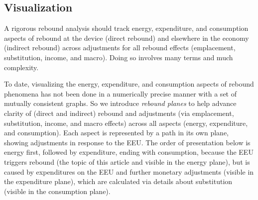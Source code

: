 \documentclass[12pt]{article}\usepackage[]{graphicx}\usepackage[]{xcolor}
\begin{document}
\subsection{Visualization}
\label{sec:path_graphs}

A rigorous rebound analysis should track
energy, expenditure, and consumption
aspects of rebound
at the device (direct rebound) and elsewhere in the economy (indirect rebound)
across adjustments for all rebound effects
(emplacement, substitution, income, and macro).
Doing so involves many terms and much complexity.

To date, visualizing the energy, expenditure, and consumption
aspects of rebound phenomena has not been
done in a numerically precise manner
with a set of mutually consistent graphs.
So we introduce \emph{rebound planes}
to help advance clarity of
(direct and indirect) rebound and
adjustments (via emplacement, substitution, income, and macro effects)
across all aspects (energy, expenditure, and consumption).
Each aspect is represented by a path in its own plane,
showing adjustments in response to the EEU.
The order of presentation below is
energy first, followed by expenditure, ending with consumption,
because the EEU triggers rebound
(the topic of this article and visible in the energy plane),
but is caused by expenditures on the EEU and further monetary adjustments
(visible in the expenditure plane),
which are calculated via details about substitution
(visible in the consumption plane).
\end{document}
